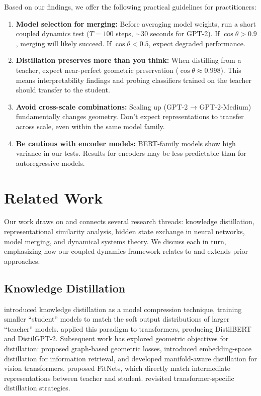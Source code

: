 \documentclass[10pt]{article} %
\theoremstyle{plain}
\theoremstyle{definition}
\theoremstyle{remark}
\begin{document}
Based on our findings, we offer the following practical guidelines for practitioners:

\begin{enumerate}
    \item \textbf{Model selection for merging:} Before averaging model weights, run a short coupled dynamics test ($T=100$ steps, $\sim$30 seconds for GPT-2). If $\cos \theta > 0.9$, merging will likely succeed. If $\cos \theta < 0.5$, expect degraded performance.
    
    \item \textbf{Distillation preserves more than you think:} When distilling from a teacher, expect near-perfect geometric preservation ($\cos \theta \approx 0.998$). This means interpretability findings and probing classifiers trained on the teacher should transfer to the student.
    
    \item \textbf{Avoid cross-scale combinations:} Scaling up (GPT-2 → GPT-2-Medium) fundamentally changes geometry. Don't expect representations to transfer across scale, even within the same model family.
    
    \item \textbf{Be cautious with encoder models:} BERT-family models show high variance in our tests. Results for encoders may be less predictable than for autoregressive models.
\end{enumerate}

\section{Related Work}

Our work draws on and connects several research threads: knowledge distillation, representational similarity analysis, hidden state exchange in neural networks, model merging, and dynamical systems theory. We discuss each in turn, emphasizing how our coupled dynamics framework relates to and extends prior approaches.

\subsection{Knowledge Distillation}

\citet{hinton2015distilling} introduced knowledge distillation as a model compression technique, training smaller ``student'' models to match the soft output distributions of larger ``teacher'' models. \citet{sanh2019distilbert} applied this paradigm to transformers, producing DistilBERT and DistilGPT-2. Subsequent work has explored geometric objectives for distillation: \citet{li2019deepgkd} proposed graph-based geometric losses, \citet{liu2023embeddistill} introduced embedding-space distillation for information retrieval, and \citet{yuan2021manifoldkd} developed manifold-aware distillation for vision transformers. \citet{romero2015fitnets} proposed FitNets, which directly match intermediate representations between teacher and student. \citet{jiao2022revisiting} revisited transformer-specific distillation strategies.
\end{document}
